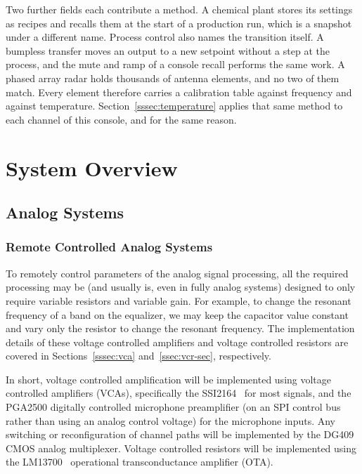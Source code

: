 \documentclass[11pt, letterpaper,titlepage]{article}
\begin{document}
Two further fields each contribute a method. A chemical plant stores its
settings as recipes and recalls them at the start of a production run, which is
a snapshot under a different name. Process control also names the transition
itself. A bumpless transfer moves an output to a new setpoint without a step at
the process, and the mute and ramp of a console recall performs the same work.
A phased array radar holds thousands of antenna elements, and no two of them
match. Every element therefore carries a calibration table against frequency and
against temperature. Section~\ref{sssec:temperature} applies that same method to
each channel of this console, and for the same reason.




\newpage
\section{System Overview}
\label{sec:overview}




\subsection{Analog Systems}
\label{ssec:analog-overview}

\subsubsection*{Remote Controlled Analog Systems}
To remotely control parameters of the analog signal processing, all the required processing may be (and usually is, even in fully analog systems) designed to only require variable resistors and variable gain. For example, to change the resonant frequency of a band on the equalizer, we may keep the capacitor value constant and vary only the resistor to change the resonant frequency. The implementation details of these voltage controlled amplifiers and voltage controlled resistors are covered in Sections~\ref{sssec:vca} and~\ref{ssec:vcr-sec}, respectively.

In short, voltage controlled amplification will be implemented using voltage controlled amplifiers (VCAs), specifically the SSI2164~\cite{ssi2164} for most signals, and the PGA2500 digitally controlled microphone preamplifier (on an SPI control bus rather than using an analog control voltage) for the microphone inputs. Any switching or reconfiguration of channel paths will be implemented by the DG409~\cite{dg409} CMOS analog multiplexer. Voltage controlled resistors will be implemented using the LM13700~\cite{lm13700} operational transconductance amplifier (OTA).
\end{document}
